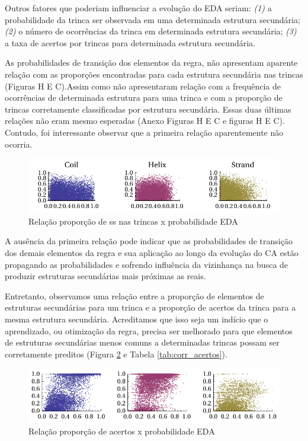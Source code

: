 Outros fatores que poderiam influenciar a evolução do EDA seriam: \textit{(1)} a probabilidade da trinca ser observada em uma determinada estrutura secundária; \textit{(2)} o número de ocorrências da trinca em determinada estrutura secundária; \textit{(3)} a taxa de acertos por trincas para determinada estrutura secundária.     

As probabilidades de transição dos elementos da regra, não apresentam aparente relação com as proporções encontradas para cada estrutura secundária nas trincas (Figuras H E C).Assim como não apresentaram relação com a frequência de ocorrências de determinada estrutura para uma trinca e com a proporção de trincas corretamente classificadas por estrutura secundária. Essas duas últimas relações não eram mesmo esperadas (Anexo Figuras H E C e figuras H E C). Contudo, foi interessante observar que a primeira relação aparentemente não ocorria. 

\begin{figure}
  \centering
  \includegraphics[width=1\textwidth]{figures/relacao_prob_propss.pdf}
  \caption{Relação proporção de ss nas trincas x probabilidade EDA}
        \label{fig:relacao_prob_propss}
\end{figure}

A ausência da primeira relação pode indicar que as probabilidades de transição dos demais elementos da regra e sua aplicação ao longo da evolução do CA estão propagando as probabilidades e sofrendo influência da vizinhança na busca de produzir estruturas secundárias mais próximas as reais. 

Entretanto, observamos uma relação entre a proporção de elementos de estruturas secundárias para um trinca e a proporção de acertos da trinca para a mesma estrutura secundária. Acreditamos que isso seja um indício que o aprendizado, ou otimização da regra, precisa ser melhorado para que elementos de estruturas secundárias menos comuns a determinadas trincas possam ser corretamente preditos (Figura \ref{fig:prop_acerto} e Tabela \ref{tab:corr_acertos}).  

\begin{figure}
  \centering
  \includegraphics[width=1\textwidth]{figures/prop_acerto.pdf}
  \caption{Relação proporção de acertos x probabilidade EDA}
        \label{fig:prop_acerto}
\end{figure}

